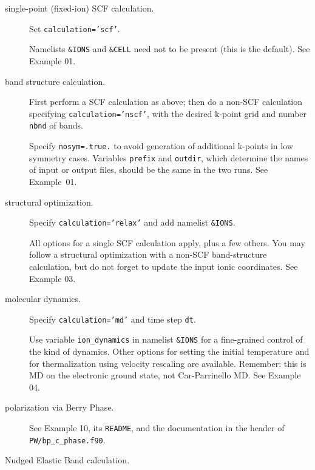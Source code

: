 \documentclass[12pt,a4paper]{article}
\begin{document}
\begin{description}

  \item [single-point (fixed-ion) SCF calculation.]

    Set \texttt{calculation='scf'}.

    Namelists \texttt{\&IONS} and \texttt{\&CELL} need not to be
    present (this is the default).  See Example 01.

  \item [band structure calculation.]

    First perform a SCF calculation as above; then do a non-SCF
    calculation specifying \texttt{calculation='nscf'}, with the
    desired k-point grid and number \texttt{nbnd} of bands.

    Specify \texttt{nosym=.true.} to avoid generation of additional
    k-points in low symmetry cases.  Variables \texttt{prefix} and
    \texttt{outdir}, which determine the names of input or output
    files, should be the same in the two runs.  See Example~01.

  \item [structural optimization.]
    
    Specify \texttt{calculation='relax'} and add namelist \texttt{\&IONS}.

    All options for a single SCF calculation apply, plus a few others.
    You may follow a structural optimization with a non-SCF
    band-structure calculation, but do not forget to update the input
    ionic coordinates.  See Example 03.

  \item [molecular dynamics.]

    Specify \texttt{calculation='md'} and time step \texttt{dt}.

    Use variable \texttt{ion\_dynamics} in namelist \texttt{\&IONS}
    for a fine-grained control of the kind of dynamics.  Other options
    for setting the initial temperature and for thermalization using
    velocity rescaling are available.  Remember: this is MD on the
    electronic ground state, not Car-Parrinello MD.  See Example 04.

  \item [polarization via Berry Phase.]

    See Example 10, its \texttt{README}, and the documentation in the
    header of \texttt{PW/bp\_c\_phase.f90}.

  \item [Nudged Elastic Band calculation.]
    

\end{description}
\end{document}
